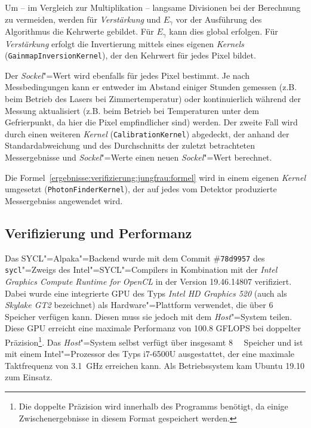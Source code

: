 Um -- im Vergleich zur Multiplikation -- langsame Divisionen bei der Berechnung
zu vermeiden, werden für \textit{Verstärkung} und $E_\gamma$ vor der Ausführung
des Algorithmus die Kehrwerte gebildet. Für $E_\gamma$ kann dies global
erfolgen. Für \textit{Verstärkung} erfolgt die Invertierung mittels eines
eigenen \textit{Kernels} (\texttt{GainmapInversionKernel}), der den Kehrwert für
jedes Pixel bildet.

Der \textit{Sockel}"=Wert wird ebenfalls für jedes Pixel bestimmt. Je nach
Messbedingungen kann er entweder im Abstand einiger Stunden gemessen (z.B. beim
Betrieb des Lasers bei Zimmertemperatur) oder kontinuierlich während der Messung
aktualisiert (z.B. beim Betrieb bei Temperaturen unter dem Gefrierpunkt, da hier
die Pixel empfindlicher sind) werden. Der zweite Fall wird durch einen weiteren
\textit{Kernel} (\texttt{CalibrationKernel}) abgedeckt, der anhand der
Standardabweichung und des Durchschnitts der zuletzt betrachteten Messergebnisse
und \textit{Sockel}"=Werte einen neuen \textit{Sockel}"=Wert berechnet.

Die Formel~\ref{ergebnisse:verifizierung:jungfrau:formel} wird in einem eigenen
\textit{Kernel} umgesetzt (\texttt{PhotonFinderKernel}), der auf jedes vom
Detektor produzierte Messergebniss angewendet wird.

\subsection{Verifizierung und Performanz}
\label{ergebnisse:verifizierung:performanz}

Das SYCL"=Alpaka"=Backend wurde mit dem Commit \#\texttt{78d9957} des
\texttt{sycl}"=Zweigs des Intel"=SYCL"=Compilers in Kombination mit der
\textit{Intel Graphics Compute Runtime for OpenCL} in der Version 19.46.14807
verifiziert. Dabei wurde eine integrierte GPU des Typs \textit{Intel HD Graphics
520} (auch als \textit{Skylake GT2} bezeichnet) als Hardware"=Plattform
verwendet, die über \SI{6}{\gibi\byte} Speicher verfügen kann. Diesen muss sie
jedoch mit dem \textit{Host}"=System teilen. Diese GPU erreicht eine maximale
Performanz von \num{100.8} GFLOPS bei doppelter Präzision\footnote{Die doppelte
Präzision wird innerhalb des Programms benötigt, da einige Zwischenergebnisse in
diesem Format gespeichert werden.}. Das \textit{Host}"=System selbst verfügt
über insgesamt \SI{8}{\gibi\byte} Speicher und ist mit einem Intel"=Prozessor
des Typs i7-6500U ausgestattet, der eine maximale Taktfrequenz von
\SI{3.1}{\giga\hertz} erreichen kann. Als Betriebssystem kam Ubuntu 19.10 zum
Einsatz.

